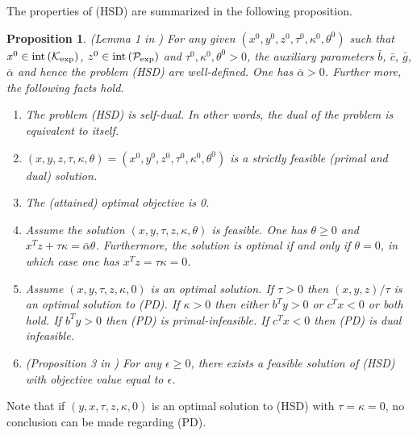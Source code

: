 \documentclass[11pt]{article}
\theoremstyle{definition}
\theoremstyle{plain}
\newtheorem{prop}{Proposition}
\def\interior{\protect{\textnormal{int}}}
\begin{document}
The properties of (HSD) are summarized in the following proposition.
\begin{prop}\label{properties_HSD} \textnormal{(Lemma 1 in \cite{Freund_behavior_HSD})}
	For any given $(x^0, y^0, z^0, \tau^0, \kappa^0, \theta^0)$ such that $x^0 \in \interior \left(\mathcal{K}_{\exp}\right)$, $z^0 \in \interior \left(\mathcal{P}_{\exp}\right)$ and $\tau^0, \kappa^0, \theta^0 > 0$, the auxiliary parameters $\bar{b}$, $\bar{c}$, $\bar{g}$, $\bar{\alpha}$ and hence the problem (HSD) are well-defined. One has $\bar{\alpha}>0$. Further more, the following facts hold.
	\begin{enumerate}
		\item The problem (HSD) is \textnormal{self-dual}. In other words, the dual of the problem is equivalent to itself. 
		\item $(x,y,z,\tau,\kappa, \theta) = (x^0,y^0,z^0, \tau^0,\kappa^0, \theta^0)$ is a strictly feasible (primal and dual) solution.
		\item The (attained) optimal objective is 0. 
		\item Assume the solution $(x,y, \tau, z,\kappa, \theta)$ is feasible. One has $\theta\geq 0$ and $x^T z + \tau \kappa = \bar{\alpha} \theta$. Furthermore, the solution is optimal if and only if $\theta=0$, in which case one has $x^T z = \tau\kappa = 0$.
		\item Assume $(x,y, \tau, z,\kappa, 0)$ is an optimal solution. If $\tau>0$ then $(x,y,z)/\tau$ is an optimal solution to (PD). If $\kappa>0$ then either $b^Ty>0$ or $c^Tx<0$ or 	
		both hold. 
		\subitem If $b^T y>0$ then (PD) is primal-infeasible.
		\subitem If $c^T x < 0$ then (PD) is dual infeasible.
		\item \textnormal{(Proposition 3 in \cite{Freund_behavior_HSD})} For any $\epsilon \geq 0$, there exists a feasible solution of (HSD) with objective value equal to $\epsilon$.
	\end{enumerate}
\end{prop} 
Note that if $(y,x,\tau,z,\kappa,0)$ is an optimal solution to (HSD) with $\tau=\kappa=0$, no conclusion can be made regarding  (PD). \\
\end{document}

